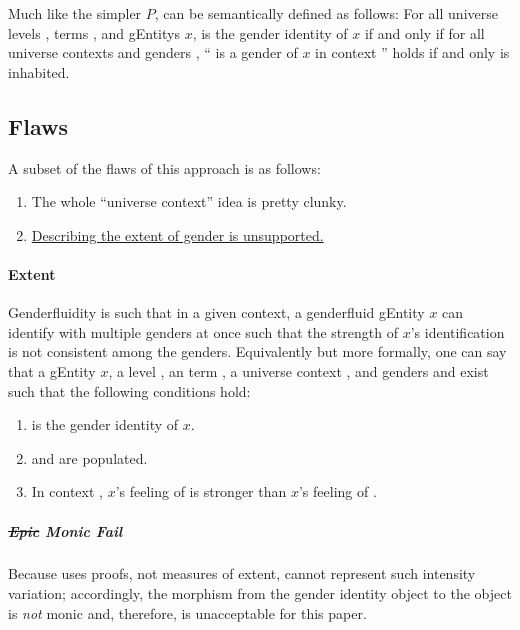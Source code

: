 \documentclass{article}
\theoremstyle{remark}
\begin{document}
Much like the simpler \(P\),  can be semantically defined as follows: For all universe levels ,   terms , and \glspl{gEntity} \(x\),  is the gender identity of \(x\) if and only if for all universe contexts  and genders , `` is a gender of \(x\) in context '' holds if and only    is inhabited.

\subsection{Flaws}
A subset of the flaws of this approach is as follows:

\begin{enumerate}
  \item The whole ``universe context'' idea is pretty clunky.\label{enum:gender4flawsClunky}
  \item \hyperref[sec:gender4Extent]{Describing the extent of gender is unsupported.}\label{enum:gender4flawsExtent}
\end{enumerate}

\paragraph{Extent}\label{sec:gender4Extent}
Genderfluidity is such that in a given context, a genderfluid \gls{gEntity} \(x\) can identify with multiple genders at once such that the strength of \(x\)'s identification is not consistent among the genders.  Equivalently but more formally, one can say that a \gls{gEntity} \(x\), a level , an   term , a universe context , and genders  and  exist such that the following conditions hold:

\begin{enumerate}
  \item {} is the gender identity of \(x\).
  \item {}   and    are populated.
  \item In context , \(x\)'s feeling of  is stronger than \(x\)'s feeling of .
\end{enumerate}

\subparagraph{\st{Epic} Monic Fail}
Because  uses proofs, not measures of extent,  cannot represent such intensity variation; accordingly, the morphism from the gender identity object to the  object is \emph{not} monic and, therefore, is unacceptable for this paper.
\end{document}
